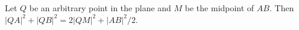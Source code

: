 Let $Q$ be an arbitrary point in the plane and $M$ be the midpoint of $AB$. Then $|QA|^2 + |QB|^2 = 2|QM|^2 + |AB|^2/2$.
